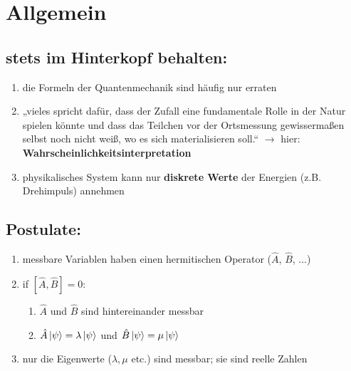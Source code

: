 \pagestyle{headings}

\section{Allgemein}

\subsection{stets im Hinterkopf behalten:}
\begin{enumerate}
\item die Formeln der Quantenmechanik sind häufig nur erraten
\item „vieles spricht dafür, dass der Zufall eine fundamentale Rolle in der Natur spielen könnte und dass 
das Teilchen vor der Ortsmessung gewissermaßen selbst noch nicht weiß, wo es sich materialisieren soll.“ $\rightarrow$ hier: \textbf{Wahrscheinlichkeitsinterpretation}
\item physikalisches System kann nur \textbf{diskrete Werte} der Energien (z.B. Drehimpuls) annehmen
\end{enumerate}

\subsection{Postulate:}
\begin{enumerate}
\item messbare Variablen haben einen hermitischen Operator ($\hat{A}$, $\hat{B}$, ...) 
\item if $[\hat{A},\hat{B}]=0$:
\begin{enumerate}
    \item $\hat{A}$ und $\hat{B}$ sind hintereinander messbar
    \item $\hat{A}\ket{\psi}=\lambda\ket{\psi}$ und $\hat{B}\ket{\psi}=\mu\ket{\psi}$
\end{enumerate}
\item nur die Eigenwerte ($\lambda,\mu$ etc.) sind messbar; sie sind reelle Zahlen 

\end{enumerate}



